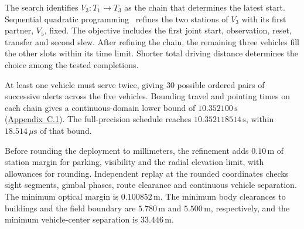 \documentclass{swmcmthesis}
\begin{document}
The search identifies \(V_3:T_1\to T_3\) as the chain that determines the latest start. Sequential quadratic programming~\cite{ref:sqp} refines the two stations of \(V_3\) with its first partner, \(V_5\), fixed. The objective includes the first joint start, observation, reset, transfer and second slew. After refining the chain, the remaining three vehicles fill the other slots within its time limit. Shorter total driving distance determines the choice among the tested completions.

At least one vehicle must serve twice, giving 30 possible ordered pairs of successive alerts across the five vehicles. Bounding travel and pointing times on each chain gives a continuous-domain lower bound of \(10.352100\,\mathrm s\) (\hyperref[app:q22-bound]{Appendix~C.1}). The full-precision schedule reaches \(10.352118514\,\mathrm s\), within \(18.514\,\mu\mathrm s\) of that bound.

Before rounding the deployment to millimeters, the refinement adds \(0.10\,\mathrm m\) of station margin for parking, visibility and the radial elevation limit, with allowances for rounding. Independent replay at the rounded coordinates checks sight segments, gimbal phases, route clearance and continuous vehicle separation. The minimum optical margin is \(0.100852\,\mathrm m\). The minimum body clearances to buildings and the field boundary are \(5.780\,\mathrm m\) and \(5.500\,\mathrm m\), respectively, and the minimum vehicle-center separation is \(33.446\,\mathrm m\).
\end{document}
